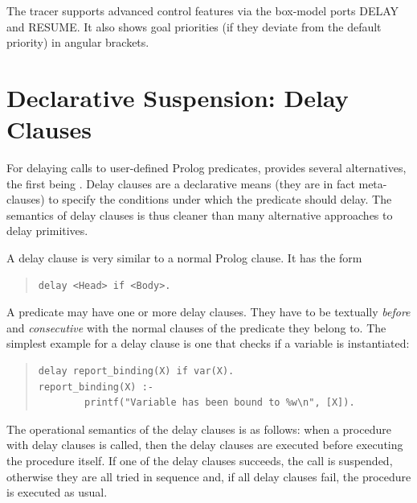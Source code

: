 The tracer supports advanced control features via
the box-model ports DELAY and RESUME.
It also shows goal priorities (if they deviate from the default priority)
in angular brackets.


\section{Declarative Suspension: Delay Clauses}

For delaying calls to user-defined Prolog predicates, {\eclipse}
 provides several alternatives, the first being .
Delay clauses are a declarative means (they are in fact meta-clauses)
to specify the conditions under which the predicate should delay.
The semantics of delay clauses is thus cleaner than many alternative
approaches to delay primitives.

A delay clause is very similar to a normal Prolog clause. It has the form
\begin{quote}
\begin{verbatim}
delay <Head> if <Body>.
\end{verbatim}
\end{quote}
A predicate may have one or more delay clauses.
They have to be textually \emph{before} and \emph{consecutive}
with the normal clauses of the predicate they belong to.
The simplest example for a delay clause is one that checks if a variable
is instantiated:
\begin{quote}
\begin{verbatim}
delay report_binding(X) if var(X).
report_binding(X) :-
        printf("Variable has been bound to %w\n", [X]).
\end{verbatim}
\end{quote}

The operational semantics of the delay clauses is as follows:
when a procedure with delay clauses is called, then the delay
clauses are executed before executing the procedure itself.
If one of the delay clauses succeeds, the call is suspended,
otherwise they are all tried in sequence and,
if all delay clauses fail, the procedure is executed as usual.

